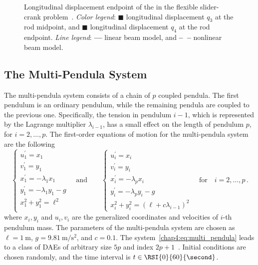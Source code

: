 \begin{figure}[htb]
  \centering
  \small{}
  \caption{Longitudinal displacement endpoint of the in the flexible slider-crank problem~\cite{lioen1998test, mazzia2008test}. \emph{Color legend}: \textcolor{mycolor2}{$\blacksquare$} longitudinal displacement $q_3$ at the rod midpoint, and \textcolor{mycolor1}{$\blacksquare$} longitudinal displacement $q_4$ at the rod endpoint. \emph{Line legend}: \textbf{---} linear beam model, and \textbf{--~--} nonlinear beam model.}
  \label{chap4:fig:flexible_slider_crank}
\end{figure}

\subsection{The Multi-Pendula System}

The multi-pendula system consists of a chain of $p$ coupled pendula. The first pendulum is an ordinary pendulum, while the remaining pendula are coupled to the previous one. Specifically, the tension in pendulum $i - 1$, which is represented by the Lagrange multiplier $\lambda_{i-1}$, has a small effect on the length of
pendulum $p$, for $i = 2, \dots, p$. The first-order equations of motion for the multi-pendula system are the following~\cite{nedialkov2008solvingIII}
%
\begin{equation}
  \begin{cases}
    u_1^{\prime} = x_1 \\
    v_1^{\prime} = y_1 \\
    x_1^{\prime} = -\lambda_1 x_1 \\
    y_1^{\prime} = -\lambda_1 y_1 - g \\
    x_1^2 + y_1^2 = \ell^2 \\
  \end{cases}
  \quad \text{and} \qquad
  \begin{cases}
    u_i^{\prime} = x_i \\
    v_i^{\prime} = y_i \\
    x_i^{\prime} = -\lambda_p x_i \\
    y_i^{\prime} = -\lambda_p y_i - g \\
    x_i^2 + y_i^2 = (\ell + c\lambda_{i-1})^2
  \end{cases}
  \quad \text{for} \quad i = 2, \dots, p \, \text{.}
  \label{chap4:eq:multi_pendula}
\end{equation}
%
where $x_i, y_i$ and $u_i, v_i$ are the generalized coordinates and velocities of $i$-th pendulum mass. The parameters of the multi-pendula system are chosen as $\ell = \SI{1}{\meter}$, $g = \SI{9.81}{\meter\per\second\squared}$, and $c = 0.1$. The system~\eqref{chap4:eq:multi_pendula} leads to a class of \acp{DAE} of arbitrary size $5p$ and index $2p+1$~\cite{nedialkov2008solvingIII}. Initial conditions are chosen randomly, and the time interval is $t \in \RSI{0}{60}{\second}$.

